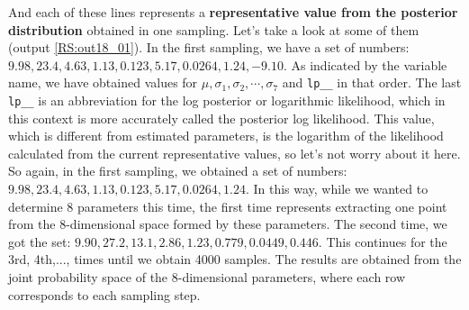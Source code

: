 \documentclass{ltjsbook}
\begin{document}
And each of these lines represents a \textbf{representative value from the posterior distribution} obtained in one sampling. Let's take a look at some of them (output \ref{RS:out18_01}).
In the first sampling, we have a set of numbers: $9.98,23.4,4.63,1.13,0.123,5.17,0.0264,1.24,-9.10$. As indicated by the variable name, we have obtained values for $\mu, \sigma_1,\sigma_2,\cdots,\sigma_7$ and \verb|lp__| in that order. The last \verb|lp__| is an abbreviation for the log posterior or logarithmic likelihood, which in this context is more accurately called the posterior log likelihood. This value, which is different from estimated parameters, is the logarithm of the likelihood calculated from the current representative values, so let's not worry about it here. So again, in the first sampling, we obtained a set of numbers: $9.98,23.4,4.63,1.13,0.123,5.17,0.0264,1.24$. In this way, while we wanted to determine 8 parameters this time, the first time represents extracting one point from the 8-dimensional space formed by these parameters. The second time, we got the set: $9.90,27.2,13.1,2.86,1.23,0.779,0.0449,0.446$. This continues for the 3rd, 4th,..., times until we obtain 4000 samples. The results are obtained from the joint probability space of the 8-dimensional parameters, where each row corresponds to each sampling step.



\end{document}
